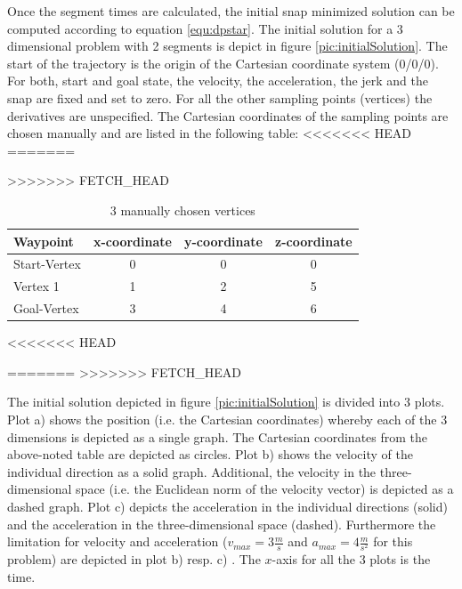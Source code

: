 Once the segment times are calculated, the initial snap minimized solution can be computed according to equation \ref{equ:dpstar}. The initial solution for a 3 dimensional problem with 2 segments is depict in figure \ref{pic:initialSolution}. The start of the trajectory is the origin of the Cartesian coordinate system (0/0/0). For both, start and goal state, the velocity, the acceleration, the jerk and the snap are fixed and set to zero. For all the other sampling points (vertices) the derivatives are unspecified. The Cartesian coordinates of the sampling points are chosen manually and are listed in the following table: 
<<<<<<< HEAD
=======

>>>>>>> FETCH_HEAD

\begin{table}[H] 
\begin{center}
    \begin{tabular}{ | l | c | c | c |}
    \hline
    Waypoint & x-coordinate & y-coordinate & z-coordinate\\ \hline
    Start-Vertex & 0 & 0 & 0 \\ \hline
    Vertex 1 & 1 & 2 & 5\\ \hline
    Goal-Vertex & 3 & 4 & 6\\
    \hline
    \end{tabular}
    \caption{3 manually chosen  vertices}
    \label{tab:vertices}
\end{center}
<<<<<<< HEAD
\end{table}
=======
\vspace*{2\baselineskip}
>>>>>>> FETCH_HEAD

The initial solution depicted in figure \ref{pic:initialSolution} is divided into 3 plots. Plot a) shows the position (i.e. the Cartesian coordinates) whereby each of the 3 dimensions is depicted as a single graph. The Cartesian coordinates from the above-noted table are depicted as circles. 
Plot b) shows the velocity of the individual direction as a solid graph. Additional, the velocity in the three-dimensional space (i.e. the Euclidean norm of the velocity vector) is depicted as a dashed graph.
Plot c) depicts the acceleration in the individual directions (solid) and the acceleration in the three-dimensional space (dashed). Furthermore the limitation for velocity and acceleration ($v_{max} = 3 \frac{m}{s}$ and $a_{max} = 4 \frac{m}{s^2}$ for this problem) are depicted in plot b) resp. c) . The $x$-axis for all the 3 plots is the time. \newpage


